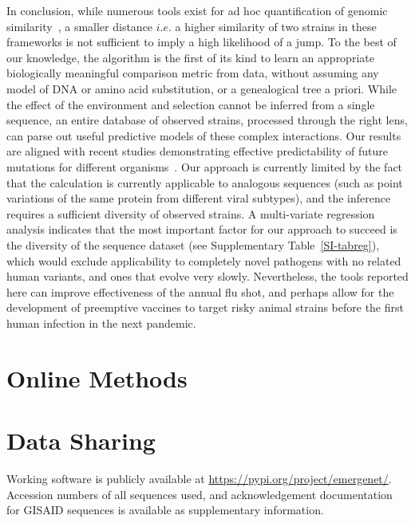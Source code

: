 \documentclass[onecolumn, compsoc,10pt]{IEEEtran}
\def\METHODS{Online Methods\xspace}
\begin{document}
In conclusion, while numerous tools exist for ad hoc quantification of genomic similarity~\cite{posada1998modeltest,goldberger2005genomic,huelsenbeck1997phylogeny,neher2014predicting,VanderMeer2010,Smith2009}, a smaller  distance $i.e.$ a higher similarity of two strains in  these frameworks is not sufficient to imply a high likelihood of a jump. To the best of our knowledge, the \enet algorithm is  the first of its kind to learn an appropriate biologically meaningful comparison metric from data, without assuming any model of DNA or amino acid substitution, or a genealogical tree a priori. While the effect of the environment and selection cannot be inferred from a single sequence, an entire database of observed strains, processed through the right lens, can parse out useful predictive models of these complex interactions. Our results are  aligned with recent studies demonstrating effective  predictability of  future mutations  for different organisms~\cite{mollentze2021identifying,maher2021predicting}. Our approach   is currently limited by the fact that the \qdist calculation is currently applicable to analogous sequences (such as point variations of the same protein from different viral subtypes), and the \enet inference requires a  sufficient diversity of observed strains. A multi-variate regression analysis indicates  that the most important factor for our approach to succeed is  the diversity of the sequence dataset (see Supplementary  Table~\ref{SI-tabreg}), which would exclude applicability to completely novel pathogens with no related human variants, and ones that evolve very slowly. Nevertheless, the tools reported here can improve effectiveness of the annual flu shot, and perhaps allow for the development of preemptive vaccines to  target risky animal strains  before the first human infection in the next pandemic.

\section*{\METHODS}






\section*{Data Sharing} 

Working software is publicly available at \href{https://pypi.org/project/quasinet/}{https://pypi.org/project/emergenet/}.
Accession numbers of all sequences used, and acknowledgement documentation for GISAID sequences is available as supplementary information.
\end{document}
